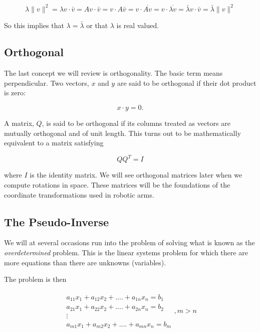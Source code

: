 \[\lambda \| v \|^2 =  \lambda v \cdot \bar{v} = Av  \cdot \bar{v} = v \cdot A \bar{v} =  v \cdot  \overline{Av} =  v \cdot  \overline{\lambda v}  = \bar{\lambda} v \cdot \bar{v} = \bar{\lambda} \| v \|^2\]

So this implies that \(\lambda = \bar{\lambda}\) or that \(\lambda\) is
real valued.

\hypertarget{orthogonal}{%
\subsection{Orthogonal}\label{orthogonal}}

The last concept we will review is orthogonality. The basic term means
perpendicular. Two vectors, \(x\) and \(y\) are said to be orthogonal if
their dot product is zero:

\[x\cdot y =0.\]

A matrix, \(Q\), is said to be orthogonal if its columns treated as
vectors are mutually orthogonal and of unit length. This turns out to be
mathematically equivalent to a matrix satisfying

\[QQ^T = I\]

where \(I\) is the identity matrix. We will see orthogonal matrices
later when we compute rotations in space. These matrices will be the
foundations of the coordinate transformations used in robotic arms.

\hypertarget{the-pseudo-inverse}{%
\subsection{The Pseudo-Inverse}\label{the-pseudo-inverse}}

We will at several occasions run into the problem of solving what is
known as the \emph{overdetermined} problem. This is the linear systems
problem for which there are more equations than there are unknowns
(variables).

The problem is then

\[\begin{aligned}
\begin{array}{c} a_{11}x_1 + a_{12}x_2 + .... + a_{1n}x_n = b_1 \\ a_{21}x_1 + a_{22}x_2 + .... + a_{2n}x_n = b_2 \\ \vdots
  \\ a_{m1}x_1 + a_{m2}x_2 + .... + a_{mn}x_n = b_m \end{array}, m > n
\end{aligned}\]

